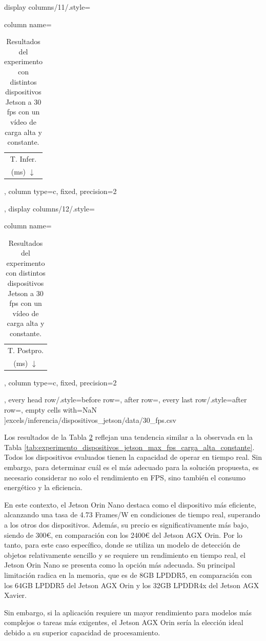 \documentclass[11pt,spanish,listoffigures,listoftables]{tfgetsinf}
\begin{document}
\begin{table}[H]
{      display columns/11/.style={column name=\begin{tabular}[c]{@{}c@{}}T. Infer.\\(ms) $\downarrow$\end{tabular}, column type={c}, fixed, precision=2},
      display columns/12/.style={column name=\begin{tabular}[c]{@{}c@{}}T. Postpro.\\(ms) $\downarrow$\end{tabular}, column type={c}, fixed, precision=2},
      every head row/.style={before row=\toprule, after row=\midrule},
      every last row/.style={after row=\bottomrule},
      empty cells with={NaN}
      ]{excels/inferencia/dispositivos_jetson/data/30_fps.csv}
      }
      \caption[Resultados del experimento con distintos dispositivos Jetson a 30 fps con un vídeo de carga alta y constante]{Resultados del experimento con distintos dispositivos Jetson a 30 fps con un vídeo de carga alta y constante.}
      \label{tab:experimento_dispositivos_jetson_30_fps_carga_alta_constante}
\end{table}

Los resultados de la Tabla \ref{tab:experimento_dispositivos_jetson_30_fps_carga_alta_constante} reflejan una tendencia similar a la observada en la Tabla \ref{tab:experimento_dispositivos_jetson_max_fps_carga_alta_constante}. Todos los dispositivos evaluados tienen la capacidad de operar en tiempo real. Sin embargo, para determinar cuál es el más adecuado para la solución propuesta, es necesario considerar no solo el rendimiento en FPS, sino también el consumo energético y la eficiencia.

En este contexto, el Jetson Orin Nano destaca como el dispositivo más eficiente, alcanzando una tasa de 4.73 Frames/W en condiciones de tiempo real, superando a los otros dos dispositivos. Además, su precio es significativamente más bajo, siendo de 300€, en comparación con los 2400€ del Jetson AGX Orin. Por lo tanto, para este caso específico, donde se utiliza un modelo de detección de objetos relativamente sencillo y se requiere un rendimiento en tiempo real, el Jetson Orin Nano se presenta como la opción más adecuada. Su principal limitación radica en la memoria, que es de 8GB LPDDR5, en comparación con los 64GB LPDDR5 del Jetson AGX Orin y los 32GB LPDDR4x del Jetson AGX Xavier.

Sin embargo, si la aplicación requiere un mayor rendimiento para modelos más complejos o tareas más exigentes, el Jetson AGX Orin sería la elección ideal debido a su superior capacidad de procesamiento.
\end{document}
